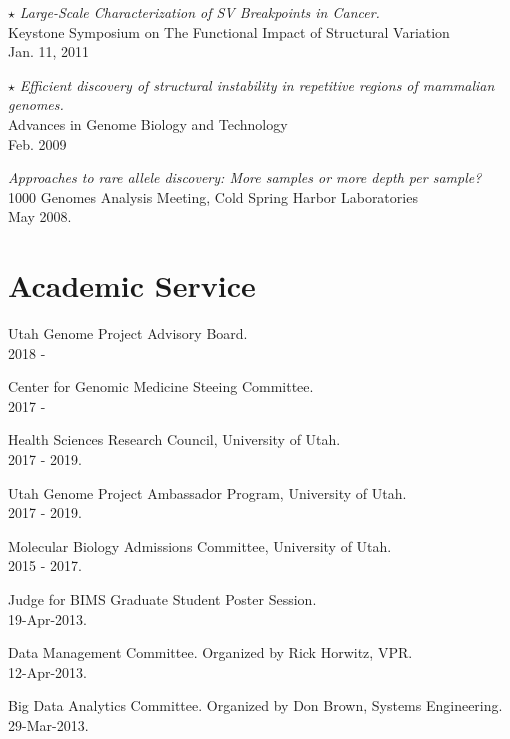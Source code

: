 \documentclass[margin,line]{cv}
\begin{document}
\begin{resume}
    $\star$ \textit{Large-Scale Characterization of SV Breakpoints in Cancer.} \\
    Keystone Symposium on The Functional Impact of Structural Variation \\
    Jan. 11, 2011

    $\star$ \textit{Efficient discovery of structural instability in repetitive regions of mammalian genomes.} \\
    Advances in Genome Biology and Technology \\
    Feb. 2009

    \textit{Approaches to rare allele discovery: More samples or more depth per sample? } \\
    1000 Genomes Analysis Meeting, Cold Spring Harbor Laboratories \\
    May 2008.

    \section{\mysidestyle Academic Service}


    Utah Genome Project Advisory Board. \\
    2018 - 

    Center for Genomic Medicine Steeing Committee. \\
    2017 - 

    Health Sciences Research Council, University of Utah. \\
    2017 - 2019.

    Utah Genome Project Ambassador Program, University of Utah. \\
    2017 - 2019.

    Molecular Biology Admissions Committee, University of Utah. \\
    2015 - 2017.

    Judge for BIMS Graduate Student Poster Session. \\
    19-Apr-2013.

    Data Management Committee. Organized by Rick Horwitz, VPR.\\
    12-Apr-2013.

    Big Data Analytics Committee. Organized by Don Brown, Systems Engineering.\\
    29-Mar-2013.


\end{resume}
\end{document}
